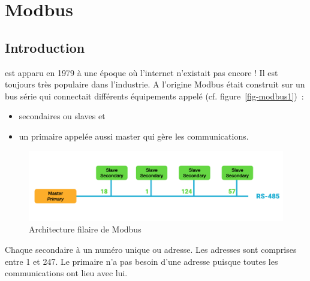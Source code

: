 





\cleardoublepage

\chapter{Modbus}

\section{Introduction}
  \begin{figure}
\end{figure}
  est apparu en 1979 à une époque où l'internet n'existait pas encore ! Il est toujours très populaire dans l'industrie. A l'origine Modbus était construit sur un bus série  qui connectait différents équipements  appelé (cf. figure~\vref{fig-modbus1})~:
 \begin{itemize}
 \item secondaires ou slaves et 
 \item un primaire appelée aussi master qui gère les communications. 
 \end{itemize}
 
 
 
 \begin{figure}[tbp]
\centerline{\includegraphics[width=1\columnwidth]{Pictures/Capture35.png}}
\caption{Architecture filaire de Modbus}
\label{fig-modbus1}
\end{figure}

 
 
 Chaque secondaire à un numéro unique ou adresse. Les adresses sont comprises entre 1 et 247. Le primaire n'a pas besoin d'une adresse puisque toutes les communications ont lieu avec lui. 
 
